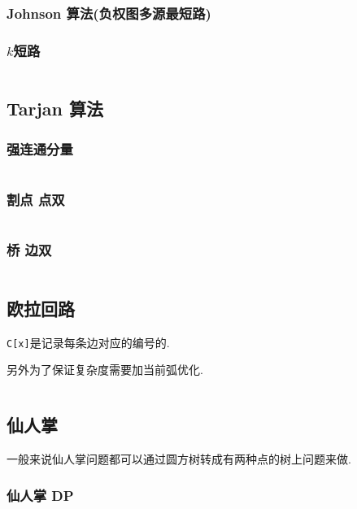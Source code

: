 \documentclass[a4paper, twoside]{article}
\begin{document}
\begin{multicols}{2}
				\subsubsection{Johnson 算法(负权图多源最短路)}
					
				


				\subsubsection{$k$短路}
					\label{kshortestpath}
					\inputminted{cpp}{../src/graph/k短路.cpp}
			
			\subsection{Tarjan 算法}
				\subsubsection{强连通分量}
					\inputminted{cpp}{../src/graph/强连通分量.cpp}
				
				\subsubsection{割点 点双}
					\inputminted{cpp}{../src/graph/割点点双.cpp}

				\subsubsection{桥 边双}
					\inputminted{cpp}{../src/graph/边双.cpp}
			
			\subsection{欧拉回路}
				\texttt{C[x]}是记录每条边对应的编号的.
				
				另外为了保证复杂度需要加当前弧优化.
				
				\inputminted{cpp}{../src/graph/欧拉回路.cpp}

			\subsection{仙人掌}
				一般来说仙人掌问题都可以通过圆方树转成有两种点的树上问题来做.
				\subsubsection{仙人掌 DP}
					\inputminted{cpp}{../src/graph/仙人掌DP.cpp}
			

\end{multicols}
\end{document}

